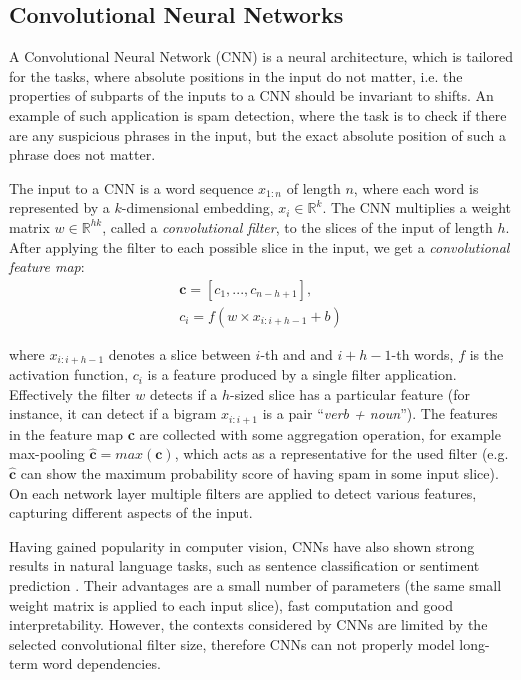\subsection{Convolutional Neural Networks}

A Convolutional Neural Network (CNN) \cite{lecun1989backpropagation} is a neural architecture, which is tailored for the tasks, where absolute positions in the input do not matter, i.e. the properties of subparts of the inputs to a CNN should be invariant to shifts. An example of such application is spam detection, where the task is to check if there are any suspicious phrases in the input, but the exact absolute position of such a phrase does not matter. 

The input to a CNN is a word sequence $x_{1:n}$ of length $n$, where each word is represented by a $k$-dimensional embedding, $x_i \in \mathbb{R}^k$. The CNN multiplies a weight matrix $w \in \mathbb{R}^{hk}$, called a \textit{convolutional filter}, to the slices of the input of length $h$. After applying the filter to each possible slice in the input, we get a \textit{convolutional feature map}:
\begin{gather*}
    \textbf{c} = [c_1, ..., c_{n-h+1}], \\
    c_i = f(w \times x_{i:i+h-1} + b)
\end{gather*}

where $x_{i:i+h-1}$ denotes a slice between $i$-th and and $i+h-1$-th words, $f$ is the activation function, $c_i$ is a feature produced by a single filter application. Effectively the filter $w$ detects if a $h$-sized slice has a particular feature (for instance, it can detect if a bigram $x_{i:i+1}$ is a pair ``\textit{verb + noun}''). The features in the feature map \textbf{c} are collected with some aggregation operation, for example max-pooling $\hat{\textbf{c}} = max{(\textbf{c})}$, which acts as a representative for the used filter (e.g. $\hat{\textbf{c}}$ can show the maximum probability score of having spam in some input slice). On each network layer multiple filters are applied to detect various features, capturing different aspects of the input.

Having gained popularity in computer vision, CNNs have also shown strong results in natural language tasks, such as sentence classification or sentiment prediction \cite{kim-2014-convolutional, kalchbrenner2014convolutional, collobert2011natural}. Their advantages are a small number of parameters (the same small weight matrix is applied to each input slice), fast computation and good interpretability. However, the contexts considered by CNNs are limited by the selected convolutional filter size, therefore CNNs can not properly model long-term word dependencies.

